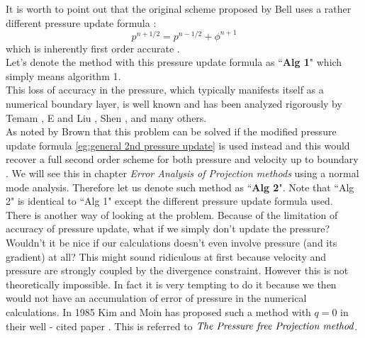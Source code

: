 It is worth to point out that the original scheme proposed by Bell uses a rather different pressure update formula \cite{bell1989second}:
\begin{equation}
p^{n+1/2} = p^{n-1/2} + \phi^{n+1}
\end{equation}
which is inherently first order accurate \cite{brown2001accurate}.\\
Let's denote the method with this pressure update formula as ``\textbf{Alg 1}" which simply means algorithm 1.\\

This loss of accuracy in the pressure, which typically manifests itself as a numerical boundary layer, is well known and has been analyzed rigorously by Temam \cite{temam1991remark}, E and Liu \cite{liu1996projection}, Shen \cite{shen1996error}, and many others.\\

As noted by Brown that this problem can be solved if the modified pressure update formula \eqref{eg:general 2nd pressure update} is used instead and this would recover a full second order scheme for both pressure and velocity up to boundary \cite{brown2001accurate}. We will see this in chapter \emph{Error Analysis of Projection methods} using a normal mode analysis. Therefore let us denote such method as ``\textbf{Alg 2}". Note that ``Alg 2" is identical to ``Alg 1" except the different pressure update formula used.\\

There is another way of looking at the problem. Because of the limitation of accuracy of pressure update, what if we simply don't update the pressure? Wouldn't it be nice if our calculations doesn't even involve pressure (and its gradient) at all? This might sound ridiculous at first because velocity and pressure are strongly coupled by the divergence constraint. However this is not theoretically impossible. In fact it is very tempting to do it because we then would not have an accumulation of error of pressure in the numerical calculations. In 1985 Kim and Moin has proposed such a method with $\textit{q}=0$ in their well - cited paper \cite{kim1985application}. This is referred to $\emph{The Pressure free Projection method}$.\\

